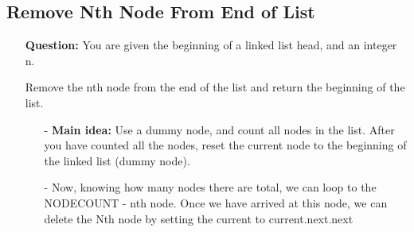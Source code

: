\documentclass[12pt]{article}
\begin{document}
\subsection{Remove Nth Node From End of List}
\begin{enumerate}
  \item[] \textbf{Question:} You are given the beginning of a linked list head, and an integer n.

Remove the nth node from the end of the list and return the beginning of the list.

    \begin{enumerate}
      \item[-] \textbf{Main idea:} Use a dummy node, and count all nodes in the list. After you have counted all the nodes, reset the current node to the beginning of the linked list (dummy node).
      \item[-] Now, knowing how many nodes there are total, we can loop to the NODECOUNT - nth node. Once we have arrived at this node, we can delete the Nth node by setting the current to current.next.next

    \end{enumerate}
\end{enumerate}
\end{document}
